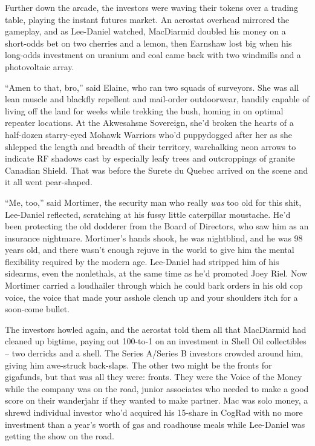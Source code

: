 Further down the arcade, the investors were waving their tokens over a 
trading table, playing the instant futures market. An aerostat overhead 
mirrored the gameplay, and as Lee-Daniel watched, MacDiarmid doubled 
his money on a short-odds bet on two cherries and a lemon, then 
Earnshaw lost big when his long-odds investment on uranium and coal 
came back with two windmills and a photovoltaic array.

“Amen to that, bro,” said Elaine, who ran two squads of surveyors. 
She was all lean muscle and blackfly repellent and mail-order 
outdoorwear, handily capable of living off the land for weeks while 
trekking the bush, homing in on optimal repeater locations. At the 
Akwesahsne Sovereign, she'd broken the hearts of a half-dozen 
starry-eyed Mohawk Warriors who'd puppydogged after her as she shlepped 
the length and breadth of their territory, warchalking neon arrows to 
indicate RF shadows cast by especially leafy trees and outcroppings of 
granite Canadian Shield. That was before the Surete du Quebec arrived 
on the scene and it all went pear-shaped.

“Me, too,” said Mortimer, the security man who really \emph{was} 
too old for this shit, Lee-Daniel reflected, scratching at his fussy 
little caterpillar moustache. He'd been protecting the old dodderer 
from the Board of Directors, who saw him as an insurance nightmare. 
Mortimer's hands shook, he was nightblind, and he was 98 years old, and 
there wasn't enough rejuve in the world to give him the mental 
flexibility required by the modern age. Lee-Daniel had stripped him of 
his sidearms, even the nonlethals, at the same time as he'd promoted 
Joey Riel. Now Mortimer carried a loudhailer through which he could 
bark orders in his old cop voice, the voice that made your asshole 
clench up and your shoulders itch for a soon-come bullet.

The investors howled again, and the aerostat told them all that 
MacDiarmid had cleaned up bigtime, paying out 100-to-1 on an investment 
in Shell Oil collectibles -- two derricks and a shell. The Series 
A/Series B investors crowded around him, giving him awe-struck 
back-slaps. The other two might be the fronts for gigafunds, but that 
was all they were: fronts. They were the Voice of the Money while the 
company was on the road, junior associates who needed to make a good 
score on their wanderjahr if they wanted to make partner. Mac was solo 
money, a shrewd individual investor who'd acquired his 15-share in 
CogRad with no more investment than a year's worth of gas and roadhouse 
meals while Lee-Daniel was getting the show on the road.

